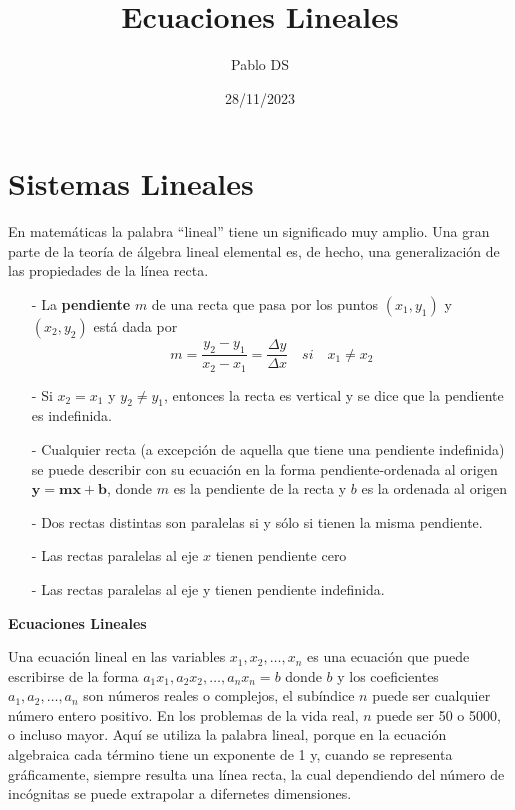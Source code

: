 \documentclass{article}
\title{Ecuaciones Lineales}
\date{28/11/2023}
\author{Pablo DS}
\begin{document}
\maketitle
\section{Sistemas Lineales}

En matemáticas la palabra “lineal” tiene un significado muy amplio. Una gran parte de la teoría de álgebra lineal elemental es, de hecho, una generalización de las propiedades de la línea recta.

\begin{tcolorbox}[colback=green!20!white,colframe=green!80!black,title=Propiedades de la Recta]
    \begin{itemize}
        \item[-] La \textbf{pendiente} $m$ de una recta que pasa por los puntos $(x_1, y_1)$ y $(x_2, y_2)$ está dada por $$m=\frac{y_2-y_1}{x_2-x_1} = \frac{\Delta y}{\Delta x} \quad si \quad x_1 \neq x_2$$
        \item[-] Si $x_2 = x_1$ y $y_2 \neq y_1$, entonces la recta es vertical y se dice que la pendiente es indefinida.
        \item[-] Cualquier recta (a excepción de aquella que tiene una pendiente indefinida) se puede describir con su ecuación en la forma pendiente-ordenada al origen $\mathbf{y= mx + b}$, donde $m$ es la pendiente de la recta y $b$ es la ordenada al origen
        \item[-] Dos rectas distintas son paralelas si y sólo si tienen la misma pendiente. 
        \item[-] Las rectas paralelas al eje $x$ tienen pendiente cero
        \item[-] Las rectas paralelas al eje y tienen pendiente indefinida.
    \end{itemize}

\end{tcolorbox}

\begin{large}
    \textbf{Ecuaciones Lineales}
\end{large}

Una ecuación lineal en las variables $ x_1,x_2,\dots, x_n $ es una ecuación que puede escribirse de la forma $ a_1x_1,a_2x_2,\dots, a_nx_n=b$ donde $b$ y los coeficientes $a_1,a_2,\dots, a_n$ son números reales o complejos, el subíndice $n$ puede ser cualquier número entero positivo. En los problemas de la vida real, $n$ puede ser 50 o 5000, o incluso mayor. Aquí se utiliza la palabra lineal, porque en la ecuación algebraica cada término tiene un exponente de 1 y, cuando se representa gráficamente, siempre resulta una línea recta, la cual dependiendo del número de incógnitas se puede extrapolar a difernetes dimensiones.
\end{document}
